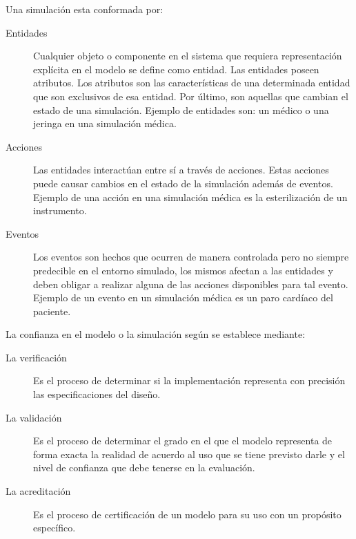 Una simulación esta conformada por:

\begin{description}

\item[Entidades] Cualquier objeto o componente en el sistema que requiera 
	representación explícita en el modelo se define como entidad\cite{banks2000dm}. 
	Las entidades poseen atributos. Los atributos son las características de una determinada 
	entidad que son exclusivos de esa entidad. Por último, son aquellas que 
	cambian el estado de una simulación. Ejemplo de entidades son: un médico o una
	jeringa en una simulación médica.

\item[Acciones] Las entidades interactúan entre sí a través de acciones. Estas
	acciones puede causar cambios en el estado de la simulación además de
	eventos. Ejemplo de una acción en una simulación médica es la
	esterilización de un instrumento.

\item[Eventos] Los eventos son hechos que ocurren de manera controlada pero no
	siempre predecible en el entorno simulado, los mismos afectan a las
	entidades y deben obligar a realizar alguna de las acciones disponibles
	para tal evento. Ejemplo de un evento en un simulación médica es un paro
	cardíaco del paciente.

\end{description}

La confianza en el modelo o la simulación según\cite{DoDSysEng2001} se establece
mediante:

\begin{description}

\item[La verificación] Es el proceso de determinar si la implementación
	representa con precisión las especificaciones del diseño. 

\item[La validación] Es el proceso de determinar el grado en el que el modelo
	representa de forma exacta la realidad de acuerdo al uso que se tiene
	previsto darle y el nivel de confianza que debe tenerse en la
	evaluación.

\item[La acreditación] Es el proceso de certificación de un modelo para su uso
	con un propósito específico.

\end{description}



